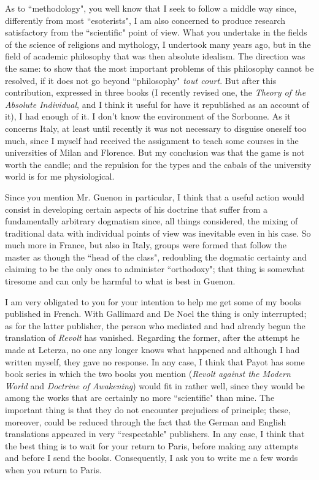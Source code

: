 As to ``methodology", you well know that I seek to follow a middle way since, differently from most ``esoterists", I am also concerned to produce research satisfactory from the ``scientific" point of view. What you undertake in the fields of the science of religions and mythology, I undertook many years ago, but in the field of academic philosophy that was then absolute idealism. The direction was the same: to show that the most important problems of this philosophy cannot be resolved, if it does not go beyond ``philosophy" \emph{tout court}. But after this contribution, expressed in three books (I recently revised one, the \emph{Theory of the Absolute Individual}, and I think it useful for have it republished as an account of it), I had enough of it. I don't know the environment of the Sorbonne. As it concerns Italy, at least until recently it was not necessary to disguise oneself too much, since I myself had received the assignment to teach some courses in the universities of Milan and Florence. But my conclusion was that the game is not worth the candle; and the repulsion for the types and the cabals of the university world is for me physiological.

Since you mention Mr. Guenon in particular, I think that a useful action would consist in developing certain aspects of his doctrine that suffer from a fundamentally arbitrary dogmatism since, all things considered, the mixing of traditional data with individual points of view was inevitable even in his case. So much more in France, but also in Italy, groups were formed that follow the master as though the ``head of the class", redoubling the dogmatic certainty and claiming to be the only ones to administer ``orthodoxy"; that thing is somewhat tiresome and can only be harmful to what is best in Guenon.

I am very obligated to you for your intention to help me get some of my books published in French. With Gallimard and De Noel the thing is only interrupted; as for the latter publisher, the person who mediated and had already begun the translation of \emph{Revolt} has vanished. Regarding the former, after the attempt he made at Leterza, no one any longer knows what happened and although I had written myself, they gave no response. In any case, I think that Payot has some book series in which the two books you mention (\emph{Revolt against the Modern World} and \emph{Doctrine of Awakening}) would fit in rather well, since they would be among the works that are certainly no more ``scientific" than mine. The important thing is that they do not encounter prejudices of principle; these, moreover, could be reduced through the fact that the German and English translations appeared in very ``respectable" publishers. In any case, I think that the best thing is to wait for your return to Paris, before making any attempts and before I send the books. Consequently, I ask you to write me a few words when you return to Paris.

